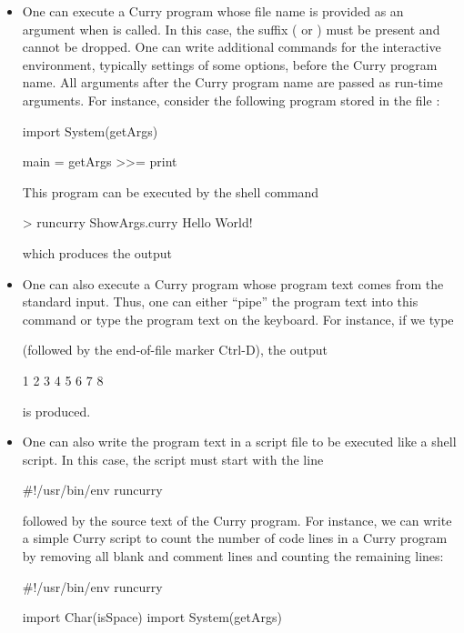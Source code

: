 \begin{itemize}
\item
One can execute a Curry program whose file name
is provided as an argument when  is called.
In this case, the suffix ( or )
must be present and cannot be dropped.
One can write additional commands for the interactive environment,
typically settings of some options, before the Curry program name.
All arguments after the Curry program name are passed as run-time
arguments. For instance, consider the following program stored
in the file :
\begin{curry}
import System(getArgs)

main = getArgs >>= print
\end{curry}
This program can be executed by the shell command
\begin{curry}
> runcurry ShowArgs.curry Hello World!
\end{curry}
which produces the output
\begin{curry}
\end{curry}

\item
One can also execute a Curry program whose program text
comes from the standard input. Thus, one can either ``pipe''
the program text into this command or type the program text on
the keyboard. For instance, if we type
(followed by the end-of-file marker Ctrl-D), the output
\begin{curry}
1
2
3
4
5
6
7
8
\end{curry}
is produced.

\item
One can also write the program text in a script file to be executed
like a shell script. In this case, the script must start with the line
\begin{curry}
#!/usr/bin/env runcurry
\end{curry}
followed by the source text of the Curry program.
For instance, we can write a simple Curry script to count the
number of code lines in a Curry program by removing all blank
and comment lines and counting the remaining lines:
\begin{currynomath}
#!/usr/bin/env runcurry

import Char(isSpace)
import System(getArgs)


\end{currynomath}
\end{itemize}
